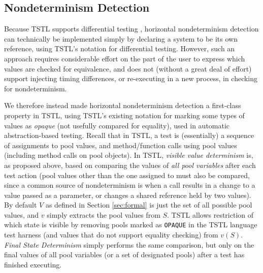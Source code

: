 \begin{comment}
\end{comment}

\subsection{Nondeterminism Detection}

Because TSTL supports differential testing \cite{tstlsttt}, horizontal
nondeterminism detection can technically be implemented simply by
declaring a system to be its own reference, using TSTL's notation for
differential testing.  However, such an approach requires considerable effort
on the part of the user to express which values are checked for
equivalence, and does not (without a great deal of effort) support injecting timing differences,
or re-executing in a new process, in checking for nondeterminism.

We therefore instead made horizontal nondeterminism detection a first-class
property in TSTL, using TSTL's existing notation for marking some
types of values as \emph{opaque} (not usefully compared for equality),
used in automatic abstraction-based testing.  Recall that in TSTL, a
test is (essentially) a sequence of assignments to pool values,
and method/function calls using pool values (including method calls on
pool objects).  In TSTL, \emph{visible
value determinism} is, as proposed above, based on comparing the values of \emph{all pool
variables} after each test action (pool values other than the one
assigned to must also be compared, since a common source of
nondeterminism is when a call results in a change to a value passed as
a parameter, or changes a shared reference held by two values).  By
default $V$ as defined in Section \ref{sec:formal} is just the set of all possible pool values, and $v$
simply extracts the pool values from $S$.
TSTL allows restriction of which state is visible by removing pools marked as {\tt OPAQUE} in the
TSTL language test harness (and values that do not support equality
checking) from $v(S)$.  \emph{Final State Determinism} simply performs the same
comparison, but only on the final values of all pool variables (or a
set of designated pools) after a test has
finished executing.

